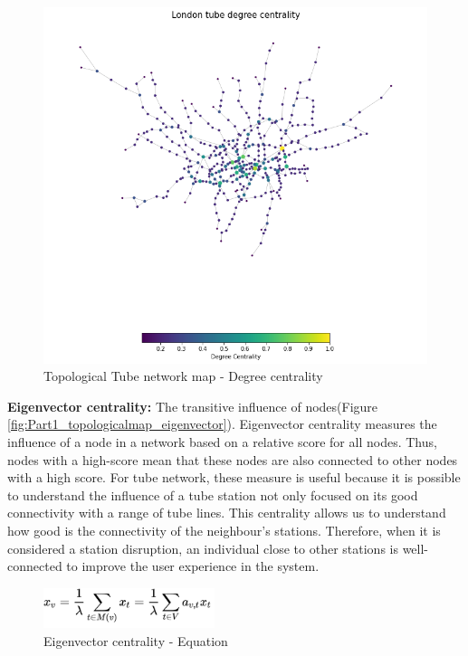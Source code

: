 \documentclass[10pt]{report}
\numberwithin{figure}{section}
\numberwithin{table}{section}
\begin{document}
    \begin{figure}[htp]
        \centering
        \includegraphics[width=12cm]{Image/Part1_topologicalmap_degree.png}
        \caption{Topological Tube network map - Degree centrality}
        \label{fig:Part1_topologicalmap_degree}
    \end{figure}   


        
\newpage  
        
        \textbf{Eigenvector centrality:}  The transitive influence of nodes(Figure \ref{fig:Part1_topologicalmap_eigenvector}). Eigenvector centrality measures the influence of a node in a network based on a relative score for all nodes. Thus, nodes with a high-score mean that these nodes are also connected to other nodes with a high score. For tube network, these measure is useful because it is possible to understand the influence of a tube station not only focused on its good connectivity with a  range of tube lines. This centrality allows us to understand how good is the connectivity of the neighbour's stations. Therefore, when it is considered a station disruption, an individual close to other stations is well-connected to improve the user experience in the system. 

    \vspace{5mm} %
        
    \begin{figure}[htp]
        \centering
        \includegraphics[width=5cm]{Image/eigenvector equation.jpeg}
        \caption{Eigenvector centrality - Equation}
        \label{fig:eigenvector equation}
    \end{figure} 
\end{document}
